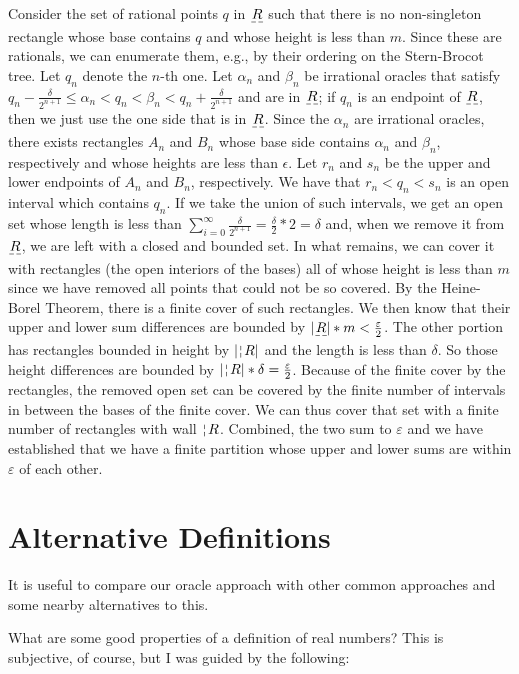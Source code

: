 \documentclass[12pt]{article}
\theoremstyle{remark}
\begin{document}
Consider the set of rational points $q$ in $\base{R}$ such that there is no non-singleton rectangle whose base contains $q$ and whose height is less than $m$. Since these are rationals, we can enumerate them, e.g.,  by their ordering on the Stern-Brocot tree. Let $q_n$ denote the $n$-th one. Let $\alpha_n$ and $\beta_n$ be irrational oracles that satisfy $q_n - \frac{\delta}{2^{n+1}} \leq \alpha_n < q_n < \beta_n < q_n + \frac{\delta}{2^{n+1}}$ and are in $\base{R}$; if $q_n$ is an endpoint of $\base{R}$, then we just use the one side that is in $\base{R}$. Since the $\alpha_n$ are irrational oracles, there exists rectangles $A_n$ and $B_n$ whose base side contains $\alpha_n$ and $\beta_n$, respectively and whose heights are less than $\epsilon$. Let $r_n$ and $s_n$ be the upper and lower endpoints of $A_n$ and $B_n$, respectively. We have that $r_n < q_n < s_n$ is an open interval which contains $q_n$. If we take the union of such intervals, we get an open set whose length is less than $\sum_{i=0}^\infty \frac{\delta}{2^{n+1}} = \frac{\delta}{2} * 2 = \delta$ and, when we remove it from $\base{R}$, we are left with a closed and bounded set. In what remains, we can cover it with rectangles (the open interiors of the bases) all of whose height is less than $m$ since we have removed all points that could not be so covered. By the Heine-Borel Theorem, there is a finite cover of such rectangles. We then know that their upper and lower sum differences are bounded by $|\base{R}|*m < \frac{\varepsilon}{2}$. The other portion has rectangles bounded in height by $|\wall{R}|$ and the length is less than $\delta$. So those height differences are bounded by $|\wall{R}|*\delta = \frac{\varepsilon}{2}$. Because of the finite cover by the rectangles, the removed open set can be covered by the finite number of intervals in between the bases of the finite cover. We can thus cover that set with a finite number of rectangles with wall $\wall{R}$. Combined, the two sum to $\varepsilon$ and we have established that we have a finite partition whose upper and lower sums are within $\varepsilon$ of each other. 


\section{Alternative Definitions}\label{sec:others}

It is useful to compare our oracle approach with other common approaches and some nearby alternatives to this. 

What are some good properties of a definition of real numbers? This is subjective, of course, but I was guided by the following: 
\end{document}
